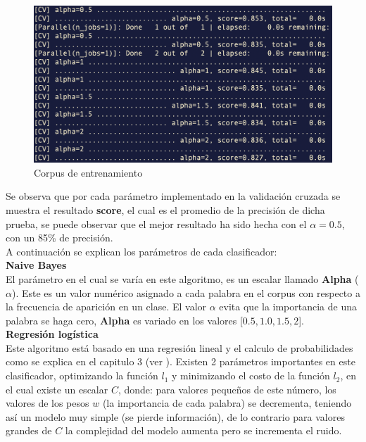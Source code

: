 \begin{figure}[h]
\centering
\includegraphics[scale=.5]{imagenes/capitulo5/Entrenamiento/gridbayes.png}
\caption{Corpus de entrenamiento}
\label{fig:cp5:gridbayes}
\end{figure}

Se observa que por cada parámetro implementado en la validación cruzada se muestra el resultado \textbf{score}, el cual es el promedio de la precisión de dicha prueba, se puede observar que el mejor resultado ha sido hecha con el $\alpha=0.5$, con un 85\% de precisión.\\


A continuación se explican los parámetros de cada clasificador: \\

\textbf{Naive Bayes}\\
 
El parámetro en el cual se varía en este algoritmo, es un escalar llamado \textbf{Alpha} ($\alpha$). Este es un valor numérico asignado a cada palabra en el corpus con respecto a la frecuencia de aparición en un clase. El valor $\alpha$ evita que la importancia de una palabra se haga cero, \textbf{Alpha} es variado en los valores [$0.5, 1.0, 1.5, 2$].\\


\textbf{Regresión logística}\\

 Este algoritmo está basado en una regresión lineal y el calculo de probabilidades como se explica en el capitulo 3 (ver ). Existen 2  parámetros importantes en este clasificador, optimizando la función $l_1$  y minimizando el costo de la función $l_2$, en el cual existe un escalar $C$, donde: para valores pequeños de este número, los valores de los pesos $w$ (la importancia de cada palabra) se decrementa, teniendo así un modelo muy simple (se pierde información), de lo contrario para valores grandes de $C$ la complejidad del modelo aumenta pero se incrementa el ruido.\\

